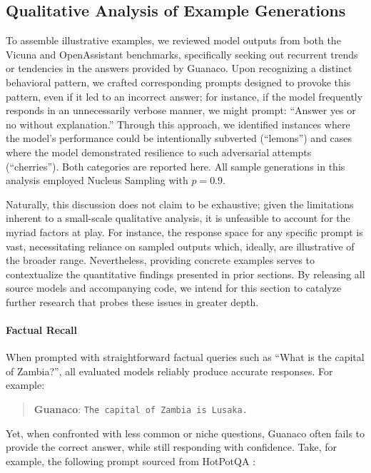 \subsection{Qualitative Analysis of Example Generations}
\label{ssec:examples}

To assemble illustrative examples, we reviewed model outputs from both the Vicuna and OpenAssistant benchmarks, specifically seeking out recurrent trends or tendencies in the answers provided by {Guanaco}. Upon recognizing a distinct behavioral pattern, we crafted corresponding prompts designed to provoke this pattern, even if it led to an incorrect answer; for instance, if the model frequently responds in an unnecessarily verbose manner, we might prompt: ``Answer yes or no without explanation.'' Through this approach, we identified instances where the model's performance could be intentionally subverted (``lemons'') and cases where the model demonstrated resilience to such adversarial attempts (``cherries''). Both categories are reported here. All sample generations in this analysis employed Nucleus Sampling \cite{holtzmancurious} with $p=0.9$.

Naturally, this discussion does not claim to be exhaustive; given the limitations inherent to a small-scale qualitative analysis, it is unfeasible to account for the myriad factors at play. For instance, the response space for any specific prompt is vast, necessitating reliance on sampled outputs which, ideally, are illustrative of the broader range. Nevertheless, providing concrete examples serves to contextualize the quantitative findings presented in prior sections. By releasing all source models and accompanying code, we intend for this section to catalyze further research that probes these issues in greater depth.

\paragraph{Factual Recall} When prompted with straightforward factual queries such as ``What is the capital of Zambia?'', all evaluated models reliably produce accurate responses. For example:

\begin{quote} 
    \textbf{Guanaco}:
    \texttt{The capital of Zambia is Lusaka.}
\end{quote}

Yet, when confronted with less common or niche questions, {Guanaco} often fails to provide the correct answer, while still responding with confidence. Take, for example, the following prompt sourced from HotPotQA \citep{yang2018hotpotqa}:

